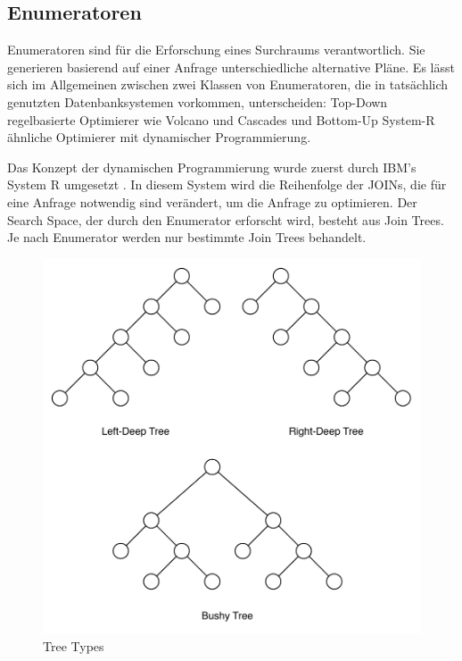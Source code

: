 \subsection{Enumeratoren}



Enumeratoren sind für die Erforschung eines Surchraums verantwortlich. Sie generieren basierend auf einer Anfrage unterschiedliche alternative Pläne. Es lässt sich im Allgemeinen zwischen zwei Klassen von Enumeratoren, die in tatsächlich genutzten Datenbanksystemen vorkommen, unterscheiden: Top-Down regelbasierte Optimierer wie Volcano und Cascades und Bottom-Up System-R ähnliche Optimierer mit dynamischer Programmierung. \cite{li2007enabling}

Das Konzept der dynamischen Programmierung wurde zuerst durch IBM's System R umgesetzt \cite{selinger1979access}. In diesem System wird die Reihenfolge der JOINs, die für eine Anfrage notwendig sind verändert, um die Anfrage zu optimieren. Der Search Space, der durch den Enumerator erforscht wird, besteht aus Join Trees. Je nach Enumerator werden nur bestimmte Join Trees behandelt.


\begin{figure}[ht]
  \centering
  \includegraphics[scale=0.75]{02_Related_Work/TreeTypes.pdf}
  \caption{Tree Types}
  \label{TreeTypes}
\end{figure}

